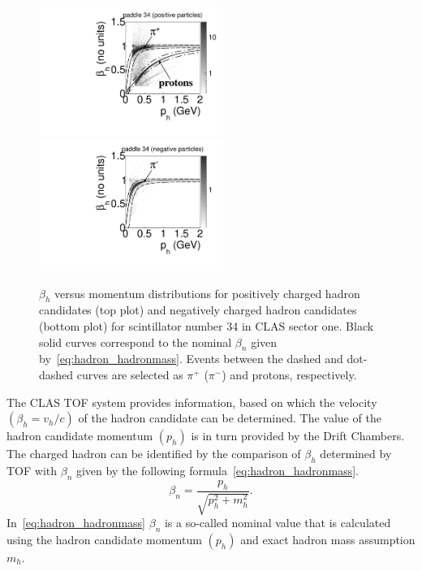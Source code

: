 \documentclass[prc,twocolumn,superscriptaddress,showpacs,amssymb,amsmath,amsfonts,linenumbers,aps]{revtex4-1}
\begin{document}
\begin{figure}[htp]
\begin{center}
 \includegraphics[width=6cm,keepaspectratio]{pictures/hadron_id/b_vs_p_positiv_time_corr.pdf}
\includegraphics[width=6cm,keepaspectratio]{pictures/hadron_id/b_vs_p_negative_time_corr.pdf} 
\vspace{-0.1cm}
\caption{$\beta_{h}$ versus momentum distributions for positively charged hadron candidates (top plot) and  negatively charged hadron candidates (bottom plot) for scintillator number 34 in CLAS sector one. Black solid curves correspond to the nominal $\beta_{n}$ given by~\eqref{eq:hadron_hadronmass}. 
Events between the dashed and dot-dashed curves are selected as $\pi^{+}$ ($\pi^{-}$) and protons, respectively.}
\label{fig:b_vs_p}
\end{center}
\end{figure} 



The CLAS TOF system provides information, based on which the 
velocity $(\beta_{h} = v_{h}/c)$ of the hadron candidate can be determined.  
The value of the hadron candidate momentum $(p_{h})$
is in turn provided by the Drift
Chambers.  The
charged hadron can be identified by the comparison of $\beta_{h}$ determined by TOF with $\beta_{n}$ given by the following formula~\eqref{eq:hadron_hadronmass}.
\begin{equation}
\beta_{n}=\frac{p_{h}}{\sqrt{p_{h}^{2}+m_{h}^{2}}}.
\label{eq:hadron_hadronmass}
\end{equation}
In~\eqref{eq:hadron_hadronmass} $\beta_{n}$ is a so-called nominal value that is calculated using the hadron candidate momentum $(p_{h})$ and exact hadron mass assumption $m_{h}$. 
\end{document}
